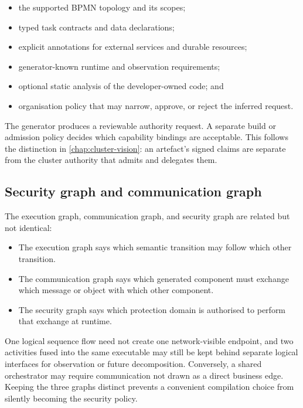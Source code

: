 \begin{itemize}
    \item the supported BPMN topology and its scopes;
    \item typed task contracts and data declarations;
    \item explicit annotations for external services and durable resources;
    \item generator-known runtime and observation requirements;
    \item optional static analysis of the developer-owned code; and
    \item organisation policy that may narrow, approve, or reject the inferred
        request.
\end{itemize}

The generator produces a reviewable authority request. A separate build or
admission policy decides which capability bindings are acceptable. This follows
the distinction in \autoref{chap:cluster-vision}: an artefact's signed claims
are separate from the cluster authority that admits and delegates them.

\subsection{Security graph and communication graph}

The execution graph, communication graph, and security graph are related but
not identical:

\begin{itemize}
    \item The execution graph says which semantic transition may follow which
        other transition.

    \item The communication graph says which generated component must exchange
        which message or object with which other component.

    \item The security graph says which protection domain is authorised to
        perform that exchange at runtime.
\end{itemize}

One logical sequence flow need not create one network-visible endpoint, and two
activities fused into the same executable may still be kept behind separate
logical interfaces for observation or future decomposition. Conversely, a
shared orchestrator may require communication not drawn as a direct business
edge. Keeping the three graphs distinct prevents a convenient compilation
choice from silently becoming the security policy.

